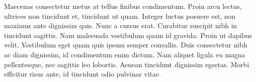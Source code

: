 \documentclass[
	a4paper, %
	10pt, %
]{CSMinimalMemo}
\begin{document}
Maecenas consectetur metus at tellus finibus condimentum. Proin arcu lectus, ultrices non tincidunt et, tincidunt ut quam. Integer luctus posuere est, non maximus ante dignissim quis. Nunc a cursus erat. Curabitur suscipit nibh in tincidunt sagittis. Nam malesuada vestibulum quam id gravida. Proin ut dapibus velit. Vestibulum eget quam quis ipsum semper convallis. Duis consectetur nibh ac diam dignissim, id condimentum enim dictum. Nam aliquet ligula eu magna pellentesque, nec sagittis leo lobortis. Aenean tincidunt dignissim egestas. Morbi efficitur risus ante, id tincidunt odio pulvinar vitae.

\end{document}
